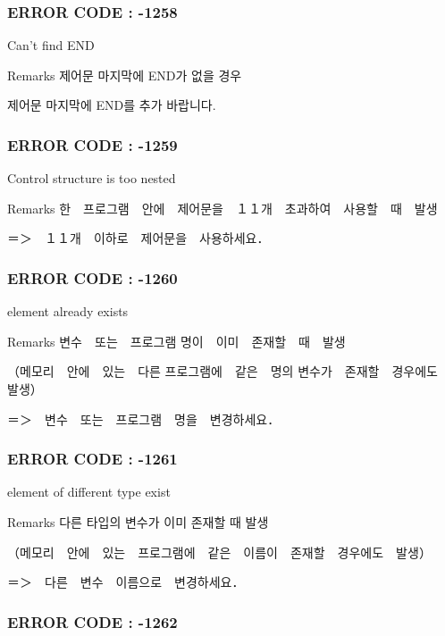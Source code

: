  \subsubsection*{E\-R\-R\-O\-R C\-O\-D\-E \-: -\/1258 }

Can't find E\-N\-D \begin{DoxyRemark}{Remarks}
제어문 마지막에 E\-N\-D가 없을 경우\par
 제어문 마지막에 E\-N\-D를 추가 바랍니다.
\end{DoxyRemark}


 \subsubsection*{E\-R\-R\-O\-R C\-O\-D\-E \-: -\/1259 }

Control structure is too nested \begin{DoxyRemark}{Remarks}
한　프로그램　안에　제어문을　１１개　초과하여　사용할　때　발생 \par
 ＝＞　１１개　이하로　제어문을　사용하세요．
\end{DoxyRemark}


 \subsubsection*{E\-R\-R\-O\-R C\-O\-D\-E \-: -\/1260 }

element already exists \begin{DoxyRemark}{Remarks}
변수　또는　프로그램 명이　이미　존재할　때　발생 \par
 （메모리　안에　있는　다른 프로그램에　같은　명의 변수가　존재할　경우에도　발생） \par
 ＝＞　변수　또는　프로그램　명을　변경하세요．
\end{DoxyRemark}


 \subsubsection*{E\-R\-R\-O\-R C\-O\-D\-E \-: -\/1261 }

element of different type exist \begin{DoxyRemark}{Remarks}
다른 타입의 변수가 이미 존재할 때 발생 \par
 （메모리　안에　있는　프로그램에　같은　이름이　존재할　경우에도　발생） \par
 ＝＞　다른　변수　이름으로　변경하세요．
\end{DoxyRemark}


 \subsubsection*{E\-R\-R\-O\-R C\-O\-D\-E \-: -\/1262 }

